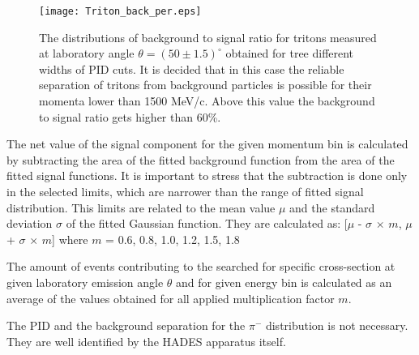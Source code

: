  \begin{figure}[!ht]
   	\centering
  	\texttt{[image: Triton\_back\_per.eps]}
   	\caption{The distributions of background to signal ratio for tritons measured at laboratory angle $\theta=(50\pm1.5)^{\circ}$ obtained for tree different widths of PID cuts.  
   	    It is decided that in this case the reliable separation of tritons from background particles is possible for their momenta lower than 1500 MeV/c. Above this value the background to signal ratio gets higher  than 60\%.
    }
   	\label{sig_back_separation}
   \end{figure} 

The net value of the signal component for the given momentum bin is calculated by subtracting the area of the fitted background function from the area of the 
fitted signal functions. It is important to stress that the subtraction is done only in the selected limits, which are narrower than the range 
of fitted signal distribution. This limits are related to the  mean value $\mu$ and the standard deviation $\sigma$ of the fitted Gaussian 
function. They are calculated as:  
[$\mu$ - $\sigma$ $\times$ $m$, $\mu$ + $\sigma$ $\times$ $m$] where $m$ = 0.6, 0.8, 1.0, 1.2, 1.5, 1.8 

The amount of events contributing to the searched for specific cross-section 
at given laboratory emission angle $\theta$ and for given energy bin 
is calculated as an average of the values obtained for all applied multiplication factor $m$.  

The PID and the background separation for  the $\pi^{-}$ distribution is not necessary. They are well identified 
by the HADES apparatus itself. 


